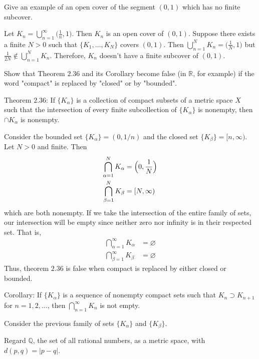 \begin{exercise}
  Give an example of an open cover of the segment \((0,1)\) which has no
  finite subcover.
  \par\smallskip
  Let \(K_n = \bigcup_{n = 1}^{\infty}\bigl(\frac{1}{n},1\bigr)\).
  Then \(K_n\) is an open cover of \((0,1)\).
  Suppose there exists a finite \(N > 0\) such that \(\{K_1,\ldots,K_N\}\)
  covers \((0,1)\).
  Then \(\bigcup_{n = 1}^NK_n = \bigl(\frac{1}{N},1\bigr)\) but
  \(\frac{1}{2N}\notin\bigcup_{n = 1}^NK_n\).
  Therefore, \(K_n\) doesn't have a finite subcover of \((0,1)\).
\item
  Show that Theorem \(2.36\) and its Corollary become false (in \(\mathbb{R}\),
  for example) if the word "compact" is replaced by "closed" or by "bounded".
  \par\smallskip
  Theorem \(2.36\): If \(\{K_{\alpha}\}\) is a collection of compact subsets of
  a metric space \(X\) such that the intersection of every finite subcollection
  of \(\{K_{\alpha}\}\) is nonempty, then \(\cap K_{\alpha}\) is nonempty.
  \par\smallskip
  Consider the bounded set \(\{K_{\alpha}\} = (0,1/n)\) and the closed set
  \(\{K_{\beta}\} = [n,\infty)\).
  Let \(N > 0\) and finite.
  Then
  \begin{align*}
    \bigcap_{\alpha = 1}^NK_{\alpha} & = \Bigl(0, \frac{1}{N}\Bigr)\\
    \bigcap_{\beta = 1}^NK_{\beta} & = [N, \infty)
  \end{align*}
  which are both nonempty.
  If we take the intersection of the entire family of sets, our intersection
  will be empty since neither zero nor infinity is in their respected set.
  That is,
  \begin{align*}
    \bigcap_{\alpha = 1}^{\infty}K_{\alpha} & = \varnothing\\
    \bigcap_{\beta = 1}^{\infty}K_{\beta} & = \varnothing
  \end{align*}
  Thus, theorem \(2.36\) is false when compact is replaced by either closed or
  bounded.
  \par\smallskip
  Corollary: If \(\{K_{\alpha}\}\) is a sequence of nonempty compact sets such
  that \(K_n\supset K_{n + 1}\) for \(n=1,2,\ldots\), then
  \(\bigcap_{n = 1}^{\infty}K_n\) is not empty.
  \par\smallskip
  Consider the previous family of sets \(\{K_{\alpha}\}\) and
  \(\{K_{\beta}\}\).
\item
  Regard \(\mathbb{Q}\), the set of all rational numbers, as a metric space,
  with \(d(p, q) = \lvert p - q\rvert\).

\end{exercise}
